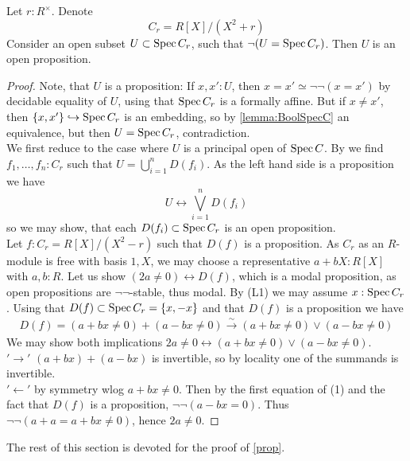 \begin{lemma}{\label{lemma:heart}}
	Let $r : R^\times$. Denote 
		\[
		C_r = R[X] / (X^2 + r) 
		\]
	Consider an open subset  $U \subset \operatorname{Spec} C_r$, such that $\lnot (U =\operatorname{Spec} C_r)$. Then $U$ is an open proposition.
\end{lemma}
\begin{proof}
	Note, that $U$ is a proposition: If $x,x' : U$, then $x = x' \simeq \lnot \lnot (x = x')$ by decidable equality of $U$, using that $\operatorname{Spec} C_r$ is a formally \etale affine. But if $x \neq x'$, then $\{x,x'\} \hookrightarrow \operatorname{Spec} C_r$ is an embedding, so by \ref{lemma:BoolSpecC} an equivalence, but then $U = \operatorname{Spec} C_r$, contradiction. \\
	We first reduce to the case where $U$ is a principal open of $\operatorname{Spec} C$. By \cite{cherubini2023foundationsyntheticalgebraicgeometry} we find $f_1,\hdots,f_n : C_r$ such that $U = \bigcup_{i=1}^n D(f_i)$. As the left hand side is a proposition we have
	\[
	U \leftrightarrow \bigvee_{i=1}^n D(f_i)
	\]
	so we may show, that each $D(f_i) \subset \operatorname{Spec} C_r$ is an open proposition. \\
	Let $f : C_r = R[X] / (X^2 - r)$ such that $D(f)$ is a proposition. As $C_r$ as an $R$-module is free with basis $1 , X$, we may choose a representative $a + bX : R[X]$ with $a,b : R$.
	Let us show $(2a \neq 0) \leftrightarrow D(f)$, which is a modal proposition, as open propositions are $\lnot \lnot$-stable, thus modal. By (L1) we may assume $x : \operatorname{Spec} C_r$.
	Using that $D(f) \subset  \operatorname{Spec} C_r =  \{x,-x\}$ and that $D(f)$ is a proposition we have
	\begin{align}
		D(f) = (a+bx \neq 0) + (a-bx \neq 0) \overset{\sim}{\to} (a+bx \neq 0) \lor (a-bx \neq 0)
	\end{align}
	We may show both implications $2a \neq 0 \leftrightarrow (a+bx \neq 0) \lor (a-bx \neq 0) $. \\
	$'\rightarrow'$ $(a+bx) + (a-bx)$ is invertible, so by locality one of the summands is invertible. \\
	$'\leftarrow'$ by symmetry wlog $a + bx \neq 0$. Then by the first equation of (1) and the fact that $D(f)$ is a proposition, $\lnot \lnot (a - bx = 0)$. Thus $\lnot \lnot (a + a = a + bx \neq 0)$, hence $2 a \neq 0$. 	
\end{proof}
The rest of this section is devoted for the proof of \ref{prop}.
